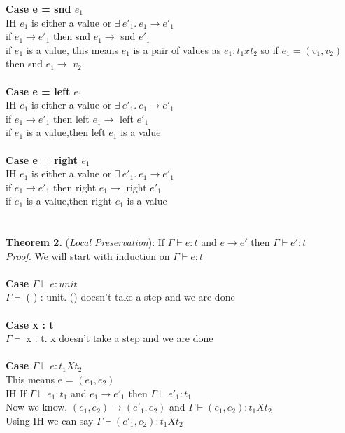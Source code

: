 \documentclass{article}
\begin{document}
\textbf{Case e = snd $e_1$} \\
IH $e_1$ is either a value or $  \exists \ e'_1.\ e_1 \to e'_1 $ \\
if $e_1 \to e'_1$ then snd $e_1 \to$ snd $e'_1$\\
if $e_1$ is a value, this means $e_1$ is a pair of values as $e_1: t_1 x t_2$
 so if $e_1 = (v_1, v_2)$ then snd $e_1 \to$ $v_2$\\ \\
\textbf{Case e = left $e_1$} \\
IH $e_1$ is either a value or $  \exists \ e'_1.\ e_1 \to e'_1 $ \\
if $e_1 \to e'_1$ then left $e_1 \to$ left $e'_1$\\
if $e_1$ is a value,then left $e_1$ is a value\\ \\
\textbf{Case e = right $e_1$} \\
IH $e_1$ is either a value or $  \exists \ e'_1.\ e_1 \to e'_1 $ \\
if $e_1 \to e'_1$ then right $e_1 \to$ right $e'_1$\\
if $e_1$ is a value,then right $e_1$ is a value
\\\\ 
\\
\textbf{Theorem 2.} (\textit{Local Preservation}): If $\Gamma \vdash e : t$ and  $e \to e'$ then $\Gamma \vdash e' : t$
  \\
\textit{Proof.} We will start with induction on $\Gamma \vdash e : t$ \\\\
\textbf{Case $\Gamma \vdash e : unit$} \\
 $\Gamma \vdash $ ( ) : unit. () doesn't take a step and we are done \\ \\
\textbf{Case x : t}      \\ 
$\Gamma \vdash $ x : t. x doesn't take a step and we are done \\ \\
\textbf{Case $\Gamma \vdash e : t_1 X t_2$ } \\
This means e = $(e_1, e_2)$ \\
IH If $\Gamma \vdash e_1 : t_1$ and  $e_1 \to e'_1$ then $\Gamma \vdash e'_1 : t_1$ \\
Now we know, $(e_1,e_2) \to (e'_1, e_2)$ and $\Gamma \vdash (e_1, e_2) : t_1 X t_2$ \\
Using IH we can say $\Gamma \vdash (e'_1, e_2) : t_1 X t_2$ \\\\
\end{document}
